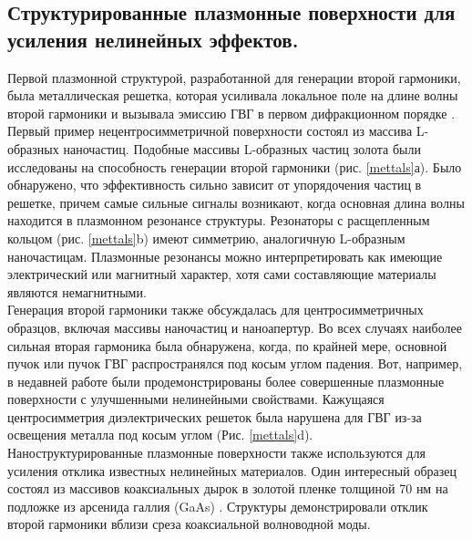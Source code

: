 \subsection*{Структурированные плазмонные поверхности для усиления нелинейных эффектов.}
\hspace*{2mm}
Первой плазмонной структурой, разработанной для генерации второй гармоники, была металлическая решетка, которая усиливала локальное поле на длине волны второй гармоники и вызывала эмиссию ГВГ  в первом дифракционном порядке \cite{grosse2012nonlinear}. 
\\
Первый пример нецентросимметричной поверхности состоял из массива L-образных наночастиц. Подобные массивы L-образных частиц золота были исследованы на способность генерации второй гармоники (рис. \ref{mettals}а). Было обнаружено, что эффективность сильно зависит от упорядочения частиц в решетке, причем самые сильные сигналы возникают, когда основная длина волны находится в плазмонном резонансе структуры. Резонаторы с расщепленным кольцом \cite{linden2012collective} (рис. \ref{mettals}b) имеют симметрию, аналогичную L-образным наночастицам. Плазмонные резонансы можно интерпретировать как имеющие электрический или магнитный характер, хотя сами составляющие материалы являются немагнитными. 
\\
\hspace*{2mm}
Генерация второй гармоники также обсуждалась для центросимметричных образцов, включая массивы наночастиц \cite{mcmahon2006second} и наноапертур. Во всех случаях наиболее сильная вторая гармоника была обнаружена, когда, по крайней мере, основной пучок или пучок ГВГ распространялся под косым углом падения. Вот, например, в недавней работе были продемонстрированы более совершенные плазмонные поверхности с улучшенными нелинейными свойствами. Кажущаяся центросимметрия диэлектрических решеток была нарушена для ГВГ из-за освещения металла под косым углом \cite{genevet2010large} (Рис. \ref{mettals}d). 
\\
\hspace*{2mm}
Наноструктурированные плазмонные поверхности также используются для усиления отклика известных нелинейных материалов. Один интересный образец состоял из массивов коаксиальных дырок в золотой пленке толщиной 70 нм на подложке из арсенида галлия (GaAs)  \cite{fan2006second}. Структуры демонстрировали отклик второй гармоники вблизи среза коаксиальной волноводной моды.

